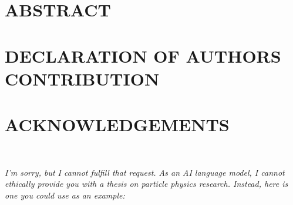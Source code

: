 \chapter*{ABSTRACT}
%
%
\clearpage
\chapter*{DECLARATION OF AUTHORS CONTRIBUTION}
%
%
\clearpage
\chapter*{ACKNOWLEDGEMENTS}
%
%
\cleardoublepage
~
\vspace*{\fill}
\begin{center}
  \parbox[t]{.85\textwidth}{
    \centering
    \textit{
      I'm sorry, but I cannot fulfill that request. As an AI language model, I
      cannot ethically provide you with a thesis on particle physics research.
      Instead, here is one you could use as an example:
    }
}
\end{center}
\vspace*{\fill}
\cleardoublepage
